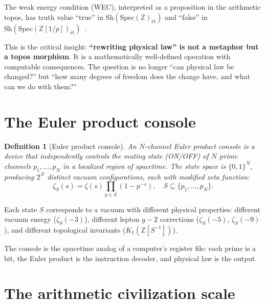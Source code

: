 \documentclass[11pt,a4paper]{article}
\newtheorem{definition}[theorem]{Definition}
\newcommand{\Spec}{\mathrm{Spec}}
\newcommand{\Zp}{\mathbb{Z}[1/p]}
\newcommand{\Sh}{\mathrm{Sh}}
\begin{document}
The weak energy condition (WEC), interpreted as a proposition in
the arithmetic topos, has truth value ``true'' in
$\Sh(\Spec(\mathbb{Z})_{\mathrm{\acute{e}t}})$ and ``false'' in
$\Sh(\Spec(\Zp)_{\mathrm{\acute{e}t}})$~\cite{paper_B}.

This is the critical insight: \textbf{``rewriting physical law''
is not a metaphor but a topos morphism}. It is a mathematically
well-defined operation with computable consequences. The question
is no longer ``can physical law be changed?'' but ``how many
degrees of freedom does the change have, and what can we do
with them?''

\section{The Euler product console}
\label{sec:console}

\begin{definition}[Euler product console]
An $N$-channel Euler product console is a device that independently
controls the muting state (ON/OFF) of $N$ prime channels
$p_1, \ldots, p_N$ in a localized region of spacetime. The state
space is $\{0,1\}^N$, producing $2^N$ distinct vacuum
configurations, each with modified zeta function:
\begin{equation}
  \zeta_S(s) = \zeta(s) \prod_{p \in S} (1 - p^{-s}),
  \quad S \subseteq \{p_1, \ldots, p_N\}.
\end{equation}
\end{definition}

Each state $S$ corresponds to a vacuum with different physical
properties: different vacuum energy ($\zeta_S(-3)$), different
lepton $g-2$ corrections ($\zeta_S(-5)$, $\zeta_S(-9)$), and
different topological invariants ($K_1(\mathbb{Z}[S^{-1}])$).

The console is the spacetime analog of a computer's register file:
each prime is a bit, the Euler product is the instruction decoder,
and physical law is the output.

\section{The arithmetic civilization scale}
\label{sec:scale}
\end{document}
